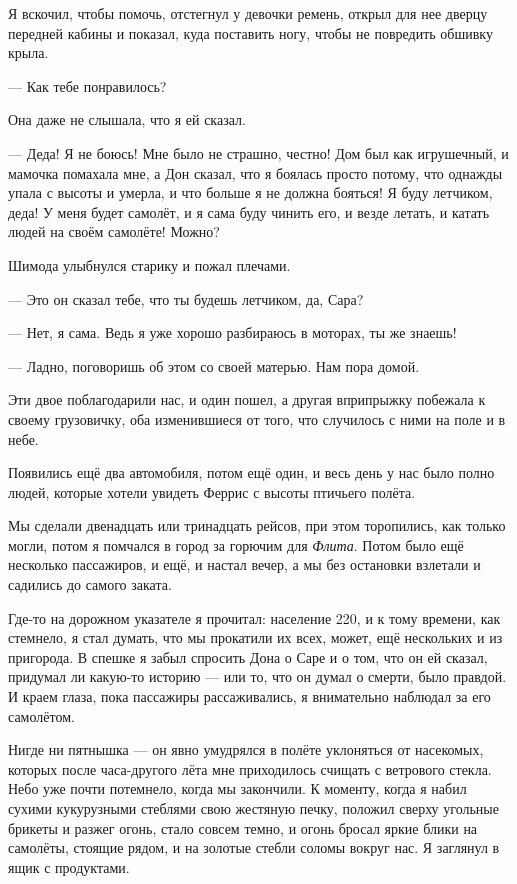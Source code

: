 Я вскочил, чтобы помочь, отстегнул у девочки ремень, открыл для нее дверцу передней кабины и показал, куда поставить ногу, чтобы не повредить обшивку крыла.

--- Как тебе понравилось?

Она даже не слышала, что я ей сказал.

--- Деда! Я не боюсь! Мне было не страшно, честно! Дом был как игрушечный, и мамочка помахала мне, а Дон сказал, что я боялась просто потому, что однажды упала с высоты и умерла, и что больше я не должна бояться! Я буду летчиком, деда! У меня будет самолёт, и я сама буду чинить его, и везде летать, и катать людей на своём самолёте! Можно?

Шимода улыбнулся старику и пожал плечами.

--- Это он сказал тебе, что ты будешь летчиком, да, Сара?

--- Нет, я сама. Ведь я уже хорошо разбираюсь в моторах, ты же знаешь!

--- Ладно, поговоришь об этом со своей матерью. Нам пора домой.

Эти двое поблагодарили нас, и один пошел, а другая вприпрыжку побежала к своему грузовичку, оба изменившиеся от того, что случилось с ними на поле и в небе.

Появились ещё два автомобиля, потом ещё один, и весь день у нас было полно людей, которые хотели увидеть Феррис с высоты птичьего полёта.

Мы сделали двенадцать или тринадцать рейсов, при этом торопились, как только могли, потом я
помчался в город за горючим для {\it Флита}. Потом было ещё несколько пассажиров, и ещё, и настал вечер, а мы без остановки взлетали и садились до самого заката.

Где-то на дорожном указателе я прочитал: население 220, и к тому времени, как стемнело, я стал
думать, что мы прокатили их всех, может, ещё нескольких и из пригорода. В спешке я забыл спросить Дона о Саре и о том, что он ей сказал, придумал ли какую-то историю --- или то, что он думал о смерти, было правдой. И краем глаза, пока пассажиры рассаживались, я внимательно наблюдал за его самолётом.

Нигде ни пятнышка --- он явно умудрялся в полёте уклоняться от насекомых, которых после часа-другого лёта мне приходилось счищать с ветрового стекла.
Небо уже почти потемнело, когда мы закончили. К моменту, когда я набил сухими кукурузными стеблями свою жестяную печку, положил сверху угольные брикеты и разжег огонь, стало совсем темно, и огонь бросал яркие блики на самолёты, стоящие рядом, и на золотые стебли соломы вокруг нас. Я заглянул в ящик с продуктами.

